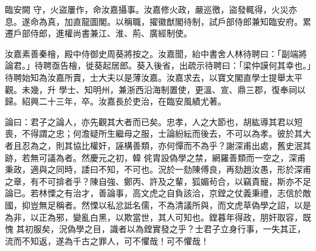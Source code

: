 \begin{pinyinscope}
 臨安闕
 守，火盜屢作，命汝嘉攝事。汝嘉修火政，嚴巡徼，盜發輒得，火災亦息。遂命為真，加直龍圖閣。以稱職，擢徽猷閣待制，試戶部侍郎兼知臨安府。累遷戶部侍郎，進權尚書兼江、淮、荊、廣經制使。



 汝嘉素善秦檜，殿中侍御史周葵將按之。汝嘉聞，紿中書舍人林待聘曰：「副端將論君。」待聘亟告檜，徙葵起居郎。葵入後省，出疏示待聘曰：「梁仲謨何其幸也。」待聘始知為汝嘉所賣，士大夫以是薄汝嘉。汝嘉求去，以寶文閣直學士提舉太平觀。未幾，升
 學士、知明州，兼浙西沿海制置使，更溫、宣、鼎三郡，復奉祠以歸。紹興二十三年，卒。汝嘉長於吏治，在臨安風績尤著。



 論曰：君子之論人，亦先觀其大者而已矣。忠孝，人之大節也，胡紘導其君以短喪，不得謂之忠；何澹疑所生繼母之服，士論紛紜而後去，不可以為孝。彼於其大者且忍為之，則其協比權奸，誣構善類，亦何憚而不為乎？謝深甫出處，舊史泯其跡，若無可議為者。然慶元之初，韓
 侂胄設偽學之禁，網羅善類而一空之，深甫秉政，適與之同時，諉曰不知，不可也。況於一劾陳傅良，再劾趙汝愚，形於深甫之章，有不可揜者乎？陳自強、鄭丙、許及之輩，狐媚茍合，以竊貴寵，斯亦不足論已。若林慄之有治才，善論事，高文虎之自負該洽，京鏜之仗義秉禮，志信於敵國，抑豈無足稱者。然慄以私忿詆名儒，不為清議所與，而文虎草偽學之詔，以是為非，以正為邪，變亂白黑，以欺當世，其人可知也。鏜暮年得政，朋奸取容，既愧
 其初服矣，況偽學之目，識者以為鏜實發之乎？士君子立身行事，一失其正，流而不知返，遂為千古之罪人，可不懼哉！可不懼哉！



\end{pinyinscope}